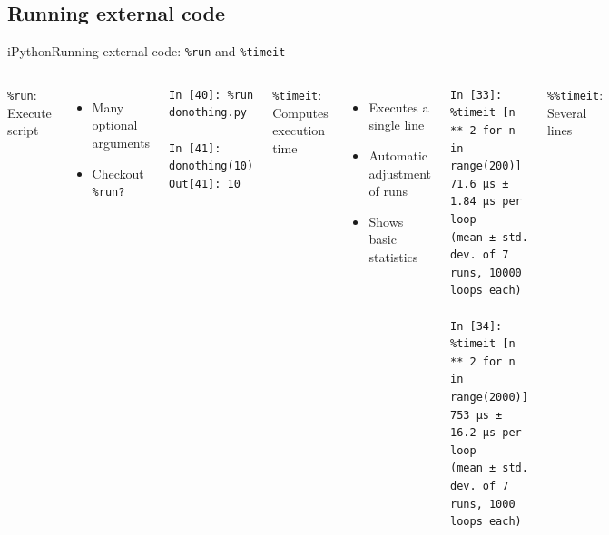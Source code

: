 \documentclass[10pt,compress]{beamer} %
\begin{document}
\subsection{Running external code}
\begin{frame}[fragile]{iPython}{Running external code: \texttt{\%run} and \texttt{\%timeit}}
	\begin{columns}[t]
	   \texttt{\%run}: Execute script
		\begin{itemize}
			\item Many optional arguments
			\item Checkout \texttt{\%run?}
		\end{itemize}
		\bigskip
		\footnotesize{
	   \begin{exampleblock}{}
	   \vspace{-0.2cm}
	   \begin{verbatim}
In [40]: %run donothing.py

In [41]: donothing(10)
Out[41]: 10
\end{verbatim}
	   \vspace{-0.2cm}
	   \end{exampleblock}
		}

	   \texttt{\%timeit}: Computes execution time
		\begin{itemize}
			\item Executes a single line
			\item Automatic adjustment of runs
			\item Shows basic statistics
		\end{itemize}

		\footnotesize{
	   \begin{exampleblock}{}
	   \vspace{-0.2cm}
	   \begin{verbatim}
In [33]: %timeit [n ** 2 for n in range(200)]
71.6 µs ± 1.84 µs per loop 
(mean ± std. dev. of 7 runs, 10000 loops each)

In [34]: %timeit [n ** 2 for n in range(2000)]
753 µs ± 16.2 µs per loop 
(mean ± std. dev. of 7 runs, 1000 loops each)
\end{verbatim}
	   \vspace{-0.2cm}
	   \end{exampleblock}
		}

		\normalsize{
	   \texttt{\%\%timeit}: Several lines\\
	   }
	\end{columns}

\end{frame}
\end{document}
